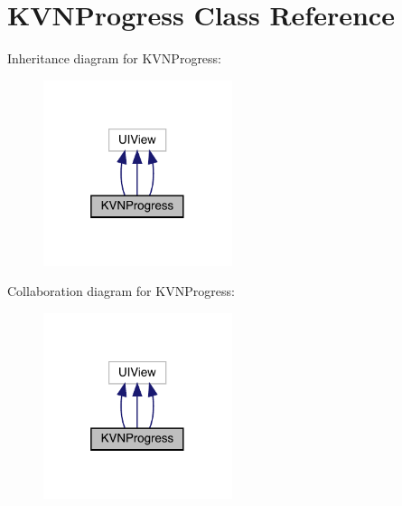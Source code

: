 \hypertarget{interface_k_v_n_progress}{}\section{K\+V\+N\+Progress Class Reference}
\label{interface_k_v_n_progress}


Inheritance diagram for K\+V\+N\+Progress\+:\nopagebreak
\begin{figure}[H]
\begin{center}
\leavevmode
\includegraphics[width=157pt]{interface_k_v_n_progress__inherit__graph}
\end{center}
\end{figure}


Collaboration diagram for K\+V\+N\+Progress\+:\nopagebreak
\begin{figure}[H]
\begin{center}
\leavevmode
\includegraphics[width=157pt]{interface_k_v_n_progress__coll__graph}
\end{center}
\end{figure}

